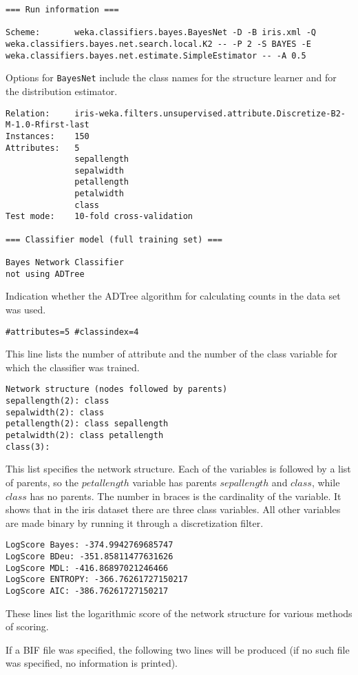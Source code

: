 \documentclass[a4paper]{article}
\begin{document}
\begin{verbatim}
=== Run information ===

Scheme:       weka.classifiers.bayes.BayesNet -D -B iris.xml -Q weka.classifiers.bayes.net.search.local.K2 -- -P 2 -S BAYES -E weka.classifiers.bayes.net.estimate.SimpleEstimator -- -A 0.5
\end{verbatim}
Options for \texttt{BayesNet} include the class names for the structure learner and for the 
distribution estimator.
\begin{verbatim}
Relation:     iris-weka.filters.unsupervised.attribute.Discretize-B2-M-1.0-Rfirst-last
Instances:    150
Attributes:   5
              sepallength
              sepalwidth
              petallength
              petalwidth
              class
Test mode:    10-fold cross-validation

=== Classifier model (full training set) ===

Bayes Network Classifier
not using ADTree
\end{verbatim}
Indication whether the ADTree algorithm \cite{Moore} for calculating counts in the
data set was used.
\begin{verbatim}
#attributes=5 #classindex=4
\end{verbatim}
This line lists the number of attribute and the number of the class variable for which the 
classifier was trained.

\begin{verbatim}
Network structure (nodes followed by parents)
sepallength(2): class 
sepalwidth(2): class 
petallength(2): class sepallength 
petalwidth(2): class petallength 
class(3): 
\end{verbatim}
This list specifies the network structure. Each of the variables is followed by
a list of parents, so the $petallength$ variable has parents $sepallength$ and $class$,
while $class$ has no parents. The number in braces is the cardinality of the variable.
It shows that in the iris dataset there are three class variables. All other variables
are made binary by running it through a discretization filter.

\begin{verbatim}
LogScore Bayes: -374.9942769685747
LogScore BDeu: -351.85811477631626
LogScore MDL: -416.86897021246466
LogScore ENTROPY: -366.76261727150217
LogScore AIC: -386.76261727150217
\end{verbatim}
These lines list the logarithmic score of the network structure for various methods
of scoring.

If a BIF file was specified, the following two lines will be produced (if no such
file was specified, no information is printed).
\end{document}
